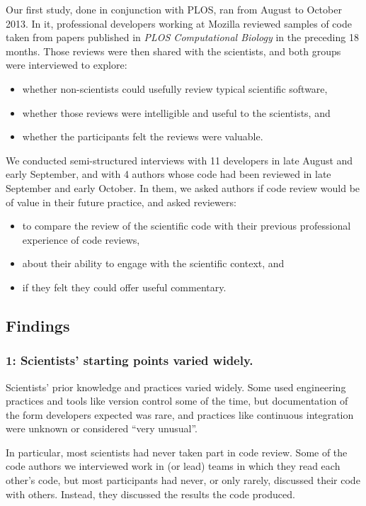 \documentclass[10pt,twocolumn]{article}
\begin{document}
Our first study,
done in conjunction with PLOS,
ran from August to October 2013.
In it,
professional developers working at Mozilla reviewed
samples of code taken from papers published in \emph{PLOS Computational Biology} in the preceding 18 months.
Those reviews were then shared with the scientists,
and both groups were interviewed to explore:

\begin{itemize}
\item whether non-scientists could usefully review typical scientific software,
\item whether those reviews were intelligible and useful to the scientists, and
\item whether the participants felt the reviews were valuable.
\end{itemize}

We conducted semi-structured interviews %
with 11 developers in late August and early September,
and with 4 authors whose code had been reviewed in late September and early October.
In them,
we asked authors if code review would be of value in their future practice,
and asked reviewers:

\begin{itemize}
\item to compare the review of the scientific code with their previous professional experience of code reviews,
\item about their ability to engage with the scientific context, and
\item if they felt they could offer useful commentary.
\end{itemize}

\subsection*{Findings}

\subsubsection*{1: Scientists' starting points varied widely.}

Scientists' prior knowledge and practices varied widely.
Some used engineering practices and tools like version control some of the time,
but documentation of the form developers expected was rare,
and practices like continuous integration were unknown or considered ``very unusual''.

In particular,
most scientists had never taken part in code review.
Some of the code authors we interviewed work in (or lead) teams in which they read each other's code,
but most participants had never,
or only rarely,
discussed their code with others.
Instead, they discussed the results the code produced.
\end{document}
